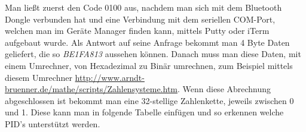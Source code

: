 \clearpage

Man ließt zuerst den Code 0100 aus, nachdem man sich mit dem Bluetooth Dongle verbunden hat und eine Verbindung mit dem seriellen COM-Port, welchen man im Geräte Manager finden kann, mittels Putty oder iTerm aufgebaut wurde.
Als Antwort auf seine Anfrage bekommt man 4 Byte Daten geliefert, die so \textit{BE1FA813} aussehen können. Danach muss man diese Daten, mit einem Umrechner, von Hexadezimal zu Binär umrechnen, zum Beispiel mittels diesem Umrechner \url{http://www.arndt-bruenner.de/mathe/scripts/Zahlensysteme.htm}. Wenn diese Abrechnung abgeschlossen ist bekommt man eine 32-stellige Zahlenkette, jeweils zwischen 0 und 1. 
Diese kann man in folgende Tabelle einfügen und so erkennen welche PID's unterstützt werden.

\begin{table}[!htb]
\centering
{}
\caption{Tabelle zur bitweisen Verarbeitung der Hexadezimal Zeichenkette \cite{SIMR.CH2-obd2.HextoBinary}}
\label{tableHextoPID}
\end{table}